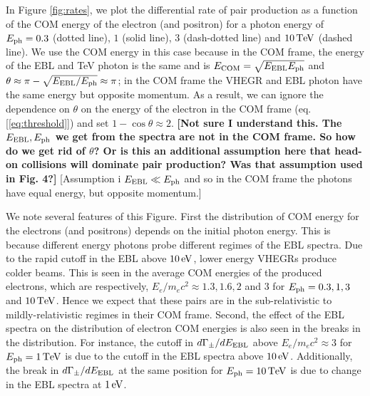 \documentclass[usenatbib,iop,apj,numberedappendix]{aeb_emulateapj_2015}
\newcommand\ep[1]{{\color{magenta} \bf #1}} %
\newcommand\phil[1]{{\color{cyan} #1}}
\def\eV{{\rm eV}} %
\def\TeV{{\rm T}\eV} %
\begin{document}
In Figure \ref{fig:rates}, we plot the differential rate of pair production as a function of the COM energy of the electron (and positron) for a photon energy of $E_{\rm ph} = 0.3$ (dotted line), $1$ (solid line), $3$ (dash-dotted line) and $10\,\TeV$ (dashed line).  We use the COM energy in this case because in the COM frame, the energy of the EBL and TeV photon is the same and is $E_{\rm COM} = \sqrt{E_{\rm EBL}E_{\rm ph}}$ and $\theta \approx \pi - \sqrt{E_{\rm EBL}/E_{\rm ph}} \approx \pi$; in the COM frame the VHEGR and EBL photon have the same energy but opposite momentum.  As a result, we can ignore the dependence on $\theta$ on the energy of the electron in the COM frame (eq.[\ref{eq:threshold}]) and set $1-\cos\theta \approx 2$. \ep{[Not sure I understand this. The $E_{\rm EBL}, E_{\rm ph}$ we get from the spectra are not in the COM frame. So how do we get rid of $\theta$? Or is this an additional assumption here that head-on collisions will dominate pair production? Was that assumption used in Fig. 4?]}\phil{[Assumption i $E_{\rm EBL} \ll E_{\rm ph}$ and so in the COM frame the photons have equal energy, but opposite momentum.]}

We note several features of this Figure.  First the distribution of COM energy for the electrons (and positrons) depends on the initial photon energy. This is because different energy photons probe different regimes of the EBL spectra.  Due to the rapid cutoff in the EBL above $10\,\eV$, lower energy VHEGRs produce colder beams.  This is seen in the average COM energies of the produced electrons, which are respectively, $E_e/m_e c^2 \approx 1.3, 1.6, 2$ and $3$ for $E_{\rm ph} = 0.3, 1, 3$ and $10\,\TeV$. Hence we expect that these pairs are in the sub-relativistic to mildly-relativistic regimes in their COM frame.
Second, the effect of the EBL spectra on the distribution of electron COM energies is also seen in the breaks in the distribution.  For instance, the cutoff in $d\Gamma_{\pm}/dE_{\rm EBL}$ above $E_e/m_e c^2 \approx 3$ for $E_{\rm ph} = 1\,\TeV$ is due to the cutoff in the EBL spectra above $10\,\eV$.  Additionally, the break in $d\Gamma_{\pm}/dE_{\rm EBL}$ at the same position for $E_{\rm ph} = 10\,\TeV$ is due to change in the EBL spectra at $1\,\eV$.  
\end{document}
